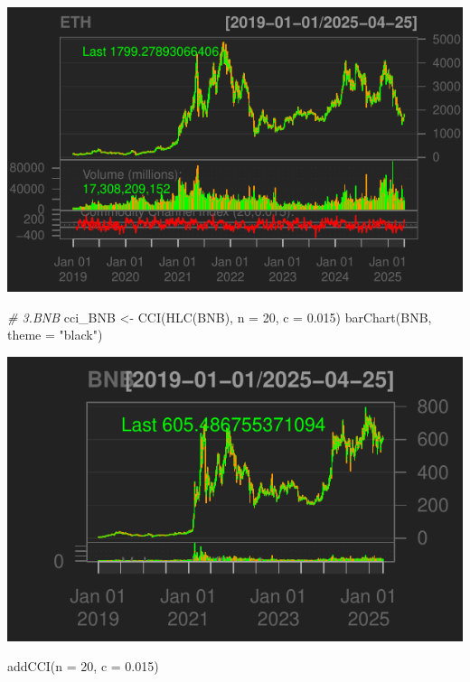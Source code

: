 \documentclass[]{tufte-handout}
\newenvironment{Shaded}{}{}
\newcommand{\AttributeTok}[1]{\textcolor[rgb]{0.49,0.56,0.16}{#1}}
\newcommand{\CommentTok}[1]{\textcolor[rgb]{0.38,0.63,0.69}{\textit{#1}}}
\newcommand{\DecValTok}[1]{\textcolor[rgb]{0.25,0.63,0.44}{#1}}
\newcommand{\FloatTok}[1]{\textcolor[rgb]{0.25,0.63,0.44}{#1}}
\newcommand{\FunctionTok}[1]{\textcolor[rgb]{0.02,0.16,0.49}{#1}}
\newcommand{\NormalTok}[1]{#1}
\newcommand{\OtherTok}[1]{\textcolor[rgb]{0.00,0.44,0.13}{#1}}
\newcommand{\StringTok}[1]{\textcolor[rgb]{0.25,0.44,0.63}{#1}}
\begin{document}
\includegraphics{cripto_update_files/figure-latex/unnamed-chunk-11-4}

\begin{Shaded}
\begin{Highlighting}[]
\CommentTok{\# 3.BNB}
\NormalTok{cci\_BNB }\OtherTok{\textless{}{-}} \FunctionTok{CCI}\NormalTok{(}\FunctionTok{HLC}\NormalTok{(BNB), }\AttributeTok{n =} \DecValTok{20}\NormalTok{, }\AttributeTok{c =} \FloatTok{0.015}\NormalTok{)}
\FunctionTok{barChart}\NormalTok{(BNB, }\AttributeTok{theme =} \StringTok{"black"}\NormalTok{)}
\end{Highlighting}
\end{Shaded}

\includegraphics{cripto_update_files/figure-latex/unnamed-chunk-11-5}

\begin{Shaded}
\begin{Highlighting}[]
\FunctionTok{addCCI}\NormalTok{(}\AttributeTok{n =} \DecValTok{20}\NormalTok{, }\AttributeTok{c =} \FloatTok{0.015}\NormalTok{)}
\end{Highlighting}
\end{Shaded}
\end{document}

